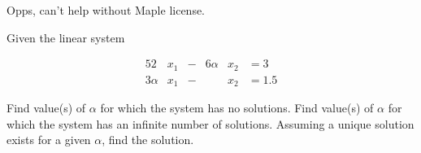 \documentclass[../../../../Assignments]{subfiles}
\begin{document}
\begin{solution}
    Opps, can't help without Maple license.
\end{solution}

\begin{exercise}
    Given the linear system

    \begin{alignat*}{5}
               2&x_1 &{}-{}& 6 \alpha& x_2 &{}=      3    \\
        3 \alpha&x_1 &{}-{}&         & x_2 &{}= \num{1.5}
    \end{alignat*}

    \begin{tasks}
        \task Find value(s) of \(\alpha\) for which the system has no solutions.
        \task Find value(s) of \(\alpha\) for which the system has an infinite
            number of solutions.
        \task Assuming a unique solution exists for a given \(\alpha\), find the
            solution.
    \end{tasks}
\end{exercise}
\end{document}
